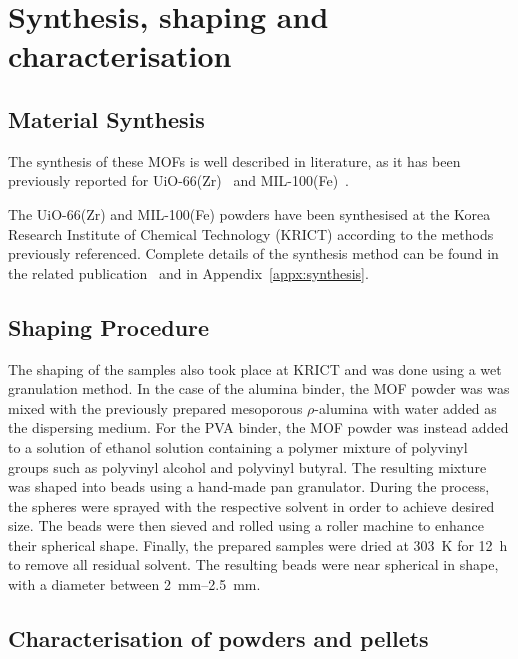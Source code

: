 
\section{Synthesis, shaping and characterisation}

\subsection{Material Synthesis}

The synthesis of these MOFs is well described in literature,
as it has been previously reported for
UiO-66(Zr)~\cite{cavkaNewZirconiumInorganic2008} and
MIL-100(Fe)~\cite{YangWaterStableMetalOrganic2013}.

The UiO-66(Zr) and MIL-100(Fe) powders have been synthesised at the
Korea Research Institute of Chemical Technology (KRICT) according
to the methods previously referenced. Complete details of the
synthesis method can be found in the related
publication~\cite{valekarShapingPorousMetal2017}
and in Appendix~\ref{appx:synthesis}.

\subsection{Shaping Procedure}

The shaping of the samples also took place at KRICT and was done
using a wet granulation method. In the case of the alumina binder,
the MOF powder was was mixed with the previously prepared mesoporous
\(\rho\)-alumina with water added as the dispersing medium. For the
PVA binder, the MOF powder was instead added to a solution of
ethanol solution containing a polymer mixture of polyvinyl groups
such as polyvinyl alcohol and polyvinyl butyral. The resulting
mixture was shaped into beads using a hand-made pan granulator.
During the process, the spheres were sprayed with the respective
solvent in order to achieve desired size. The beads were then sieved
and rolled using a roller machine to enhance their spherical
shape. Finally, the prepared samples were dried at \SI{303}{\kelvin}
for \SI{12}{\hour} to remove all residual solvent.
The resulting beads were near spherical in shape, with a diameter
between \SIrange{2}{2.5}{\milli\metre}.

\subsection{Characterisation of powders and pellets}


